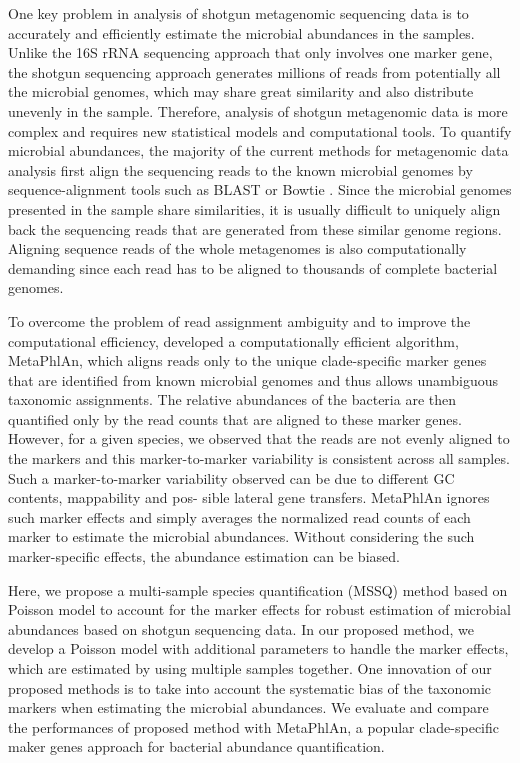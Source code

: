 One key problem in analysis of shotgun metagenomic sequencing data is to accurately and efficiently estimate the microbial abundances in the samples. Unlike the 16S rRNA sequencing approach that only involves one marker gene, the shotgun sequencing approach generates millions of reads from potentially all the microbial genomes, which may share great similarity and also distribute unevenly in the sample. Therefore, analysis of shotgun metagenomic data is more complex and requires new statistical models and computational tools. To quantify microbial abundances, the majority of the current methods for metagenomic data analysis first align the sequencing reads to the known microbial genomes by sequence-alignment tools such as BLAST \citep{altschul1990basic} or Bowtie \citep{Langmead:2009wk}. Since the microbial genomes presented in the sample share similarities, it is usually difficult to uniquely align back the sequencing reads that are generated from these similar genome regions. Aligning sequence reads of the whole metagenomes is also computationally demanding since each read has to be aligned to thousands of complete bacterial genomes.

To overcome the problem of read assignment ambiguity and to improve the computational efficiency, \citet{segata2012metagenomic} developed a computationally efficient algorithm, MetaPhlAn, which aligns reads only to the unique clade-specific marker genes that are identified from known microbial genomes and thus allows unambiguous taxonomic assignments. The relative abundances of the bacteria are then quantified only by the read counts that are aligned to these marker genes. However, for a given species, we observed that the reads are not evenly aligned to the markers and this marker-to-marker variability is consistent across all samples. Such a marker-to-marker variability observed can be due to different GC contents, mappability and pos- sible lateral gene transfers. MetaPhlAn ignores such marker effects and simply averages the normalized read counts of each marker to estimate the microbial abundances. Without considering the such marker-specific effects, the abundance estimation can be biased.


Here, we propose a multi-sample species quantification (MSSQ) method based on Poisson model to account for the marker effects for robust estimation of microbial abundances based on shotgun sequencing data. In our proposed method, we develop a Poisson model with additional parameters to handle the marker effects, which are estimated by using multiple samples together. One innovation of our proposed methods is to take into account the systematic bias of the taxonomic markers when estimating the microbial abundances. We evaluate and compare the performances of proposed method with MetaPhlAn, a popular clade-specific maker genes approach for bacterial abundance quantification.



